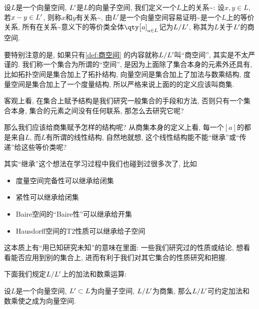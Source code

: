     \begin{definition}[商空间]\label{def:商空间}
        设$L$是一个向量空间, $L^{\prime}$是$L$的向量子空间, 我们定义一个$L$上的关系\~{}: 设$x,y\in L$, 若$x-y\in L^{\prime}$, 则称$x$和$y$有关系\~{}, 由$L^{\prime}$是一个向量空间容易证明\~{}是一个$L$上的等价关系, 所有在关系\~{}意义下的等价类全体$\qty\big{[a]}_{a\in L}$记为$L/L^{\prime}$, 称其为$L$关于$L^{\prime}$的商空间.
    \end{definition}
    \begin{remark}
        要特别注意的是, 如果只有\autoref{def:商空间} 的内容就称$L/L^{\prime}$叫“商空间”, 其实是不太严谨的. 我们称一个集合为所谓的“空间”, 是因为上面除了集合本身的元素外还具有, 比如拓扑空间是集合加上了拓扑结构, 向量空间是集合加上了加法与数乘结构, 度量空间是集合加上了一个度量结构, 所以严格来说上面的的定义应该叫商集.

        客观上看, 在集合上赋予结构是我们研究一般集合的手段和方法, 否则只有一个集合本身, 集合的元素之间没有任何联系, 那怎么去研究它呢? 

        那么我们应该给商集赋予怎样的结构呢? 从商集本身的定义上看, 每一个$[a]$的都是来自$L$, 而$L$有所谓的线性结构, 自然地就想, 这个线性结构能不能“继承”或“传递”给这些等价类呢?  

        其实“继承”这个想法在学习过程中我们也碰到过很多次了, 比如
        \begin{itemize}
            \item 度量空间完备性可以继承给闭集
            \item 紧性可以继承给闭集
            \item Baire空间的“Baire性”可以继承给开集
            \item Hausdorff空间的T2性质可以继承给子空间
        \end{itemize}
        这本质上有“用已知研究未知”的意味在里面: 一些我们研究过的性质或结论, 想看看能否应用到别的集合上, 进而有利于我们对其它集合的性质研究和把握.
    \end{remark}
    下面我们规定$L/L^{\prime}$上的加法和数乘运算: 
    \begin{proposition}
        设$L$是一个向量空间, $L^{\prime} \subset L$为向量子空间, $L/L^{\prime}$为商集, 那么$L/L^{\prime}$可约定加法和数乘使之成为向量空间. 
    \end{proposition}
